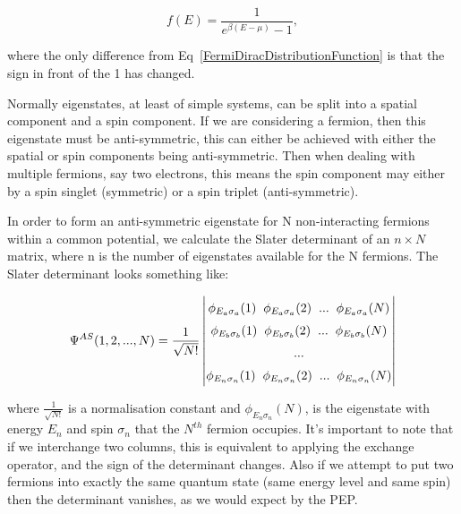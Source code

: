 \begin{equation}
    f(E) = \frac{1}{e^{\beta (E - \mu)} - 1},
    \label{BoseEinsteinDistributionFunction}
\end{equation}

\noindent where the only difference from Eq~\ref{FermiDiracDistributionFunction} is that the sign in front of the 1 has changed.

\noindent Normally eigenstates, at least of simple systems, can be split into a spatial component and a spin component. If we are considering a fermion, then this eigenstate must be anti-symmetric, this can either be achieved with either the spatial or spin components being anti-symmetric. Then when dealing with multiple fermions, say two electrons, this means the spin component may either by a spin singlet (symmetric) or a spin triplet (anti-symmetric).

\noindent In order to form an anti-symmetric eigenstate for N non-interacting fermions within a common potential, we calculate the Slater determinant of an $n \times N$ matrix, where n is the number of eigenstates available for the N fermions. The Slater determinant looks something like:

\begin{equation}
    \renewcommand*{\arraystretch}{1.5}
    \setlength\arraycolsep{20pt}
    \Psi^{AS} (1, 2, ..., N) = \frac{1}{\sqrt{N!}} \begin{vmatrix} \phi_{E_a\sigma_a} (1) \hspace{2mm} \phi_{E_a\sigma_a} (2) \hspace{2mm} ... \hspace{2mm} \phi_{E_a\sigma_a} (N) \\ \phi_{E_b\sigma_b} (1) \hspace{2mm} \phi_{E_b\sigma_b} (2) \hspace{2mm} ... \hspace{2mm} \phi_{E_b\sigma_b} (N) \\ ... \\ \phi_{E_n\sigma_n} (1) \hspace{2mm} \phi_{E_n\sigma_n} (2) \hspace{2mm} ... \hspace{2mm} \phi_{E_n\sigma_n} (N)      \end{vmatrix}
    \label{SlaterDeterminant}
\end{equation}

\noindent where $\frac{1}{\sqrt{N!}}$ is a normalisation constant and $\phi_{E_n\sigma_n} (N)$, is the eigenstate with energy $E_n$ and spin $\sigma_n$ that the $N^{th}$ fermion occupies. It's important to note that if we interchange two columns, this is equivalent to applying the exchange operator, and the sign of the determinant changes. Also if we attempt to put two fermions into exactly the same quantum state (same energy level and same spin) then the determinant vanishes, as we would expect by the PEP.

